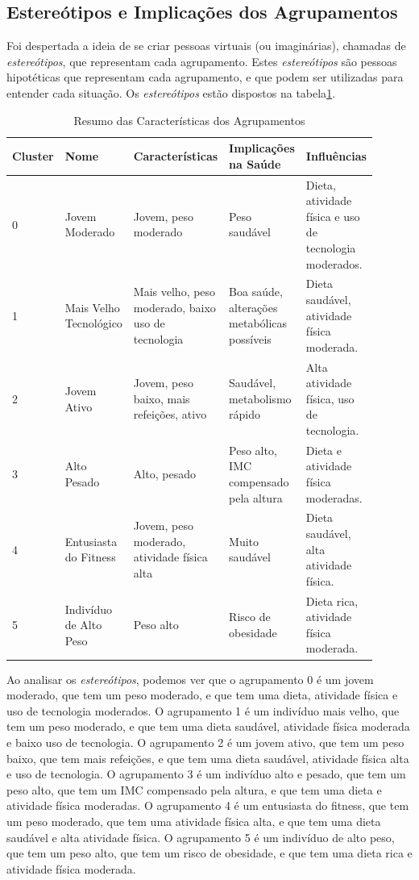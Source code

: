 \documentclass{easychair}
\begin{document}
\subsection{Estereótipos e Implicações dos Agrupamentos}

Foi despertada a ideia de se criar pessoas virtuais (ou imaginárias), chamadas de \textit{estereótipos}, que representam cada agrupamento. Estes \textit{estereótipos} são pessoas hipotéticas que representam cada agrupamento, e que podem ser utilizadas para entender cada situação. Os \textit{estereótipos} estão dispostos na tabela\ref{tab:stereotypes}.

\begin{table}[ht]
  \centering
  \begin{tabular}{p{0.1\linewidth} p{0.2\linewidth} p{0.2\linewidth} p{0.2\linewidth} p{0.2\linewidth}}
  \toprule
  Cluster & Nome & Características & Implicações na Saúde & Influências \\
  \midrule
  0 & Jovem Moderado & Jovem, peso moderado & Peso saudável & Dieta, atividade física e uso de tecnologia moderados. \\
  1 & Mais Velho Tecnológico & Mais velho, peso moderado, baixo uso de tecnologia & Boa saúde, alterações metabólicas possíveis & Dieta saudável, atividade física moderada. \\
  2 & Jovem Ativo & Jovem, peso baixo, mais refeições, ativo & Saudável, metabolismo rápido & Alta atividade física, uso de tecnologia. \\
  3 & Alto Pesado & Alto, pesado & Peso alto, IMC compensado pela altura & Dieta e atividade física moderadas. \\
  4 & Entusiasta do Fitness & Jovem, peso moderado, atividade física alta & Muito saudável & Dieta saudável, alta atividade física. \\
  5 & Indivíduo de Alto Peso & Peso alto & Risco de obesidade & Dieta rica, atividade física moderada. \\
  \bottomrule
  \end{tabular}
  \caption{Resumo das Características dos Agrupamentos}
  \label{tab:stereotypes}
\end{table}

Ao analisar os \textit{estereótipos}, podemos ver que o agrupamento 0 é um jovem moderado, que tem um peso moderado, e que tem uma dieta, atividade física e uso de tecnologia moderados. O agrupamento 1 é um indivíduo mais velho, que tem um peso moderado, e que tem uma dieta saudável, atividade física moderada e baixo uso de tecnologia. O agrupamento 2 é um jovem ativo, que tem um peso baixo, que tem mais refeições, e que tem uma dieta saudável, atividade física alta e uso de tecnologia. O agrupamento 3 é um indivíduo alto e pesado, que tem um peso alto, que tem um IMC compensado pela altura, e que tem uma dieta e atividade física moderadas. O agrupamento 4 é um entusiasta do fitness, que tem um peso moderado, que tem uma atividade física alta, e que tem uma dieta saudável e alta atividade física. O agrupamento 5 é um indivíduo de alto peso, que tem um peso alto, que tem um risco de obesidade, e que tem uma dieta rica e atividade física moderada.
\end{document}
